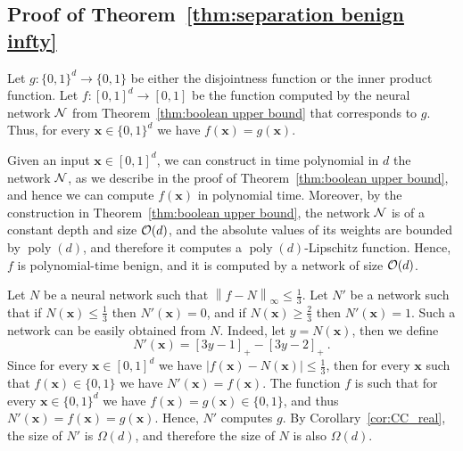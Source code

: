 \documentclass[11pt]{article}
\newcommand{\bx}{\mathbf{x}}
\newcommand{\co}{{\cal O}}
\newcommand{\cn}{{\cal N}}
\DeclareMathOperator{\poly}{poly}
\newcommand{\norm}[1]{\left\|#1\right\|}
\begin{document}
\subsection{Proof of Theorem~\ref{thm:separation benign infty}}
\label{app:proof of theorem separation benign infty}

Let $g:\{0,1\}^d \rightarrow \{0,1\}$ be either the disjointness function or the inner product function.
Let $f:[0,1]^d \rightarrow [0,1]$ be the function computed by the neural network $\cn$ from Theorem~\ref{thm:boolean upper bound} that corresponds to $g$. Thus, for every $\bx \in \{0,1\}^d$ we have $f(\bx)=g(\bx)$.

Given an input $\bx \in [0,1]^d$, we can construct in time polynomial in $d$ the network $\cn$, as we describe in the proof of Theorem~\ref{thm:boolean upper bound}, and hence we can compute $f(\bx)$ in polynomial time. Moreover, by the construction in Theorem~\ref{thm:boolean upper bound}, the network $\cn$ is of a constant depth and size $\co(d)$, and the absolute values of its weights are bounded by $\poly(d)$, and therefore it computes a $\poly(d)$-Lipschitz function. Hence, $f$ is polynomial-time benign, and it is computed by a network of size $\co(d)$. 

Let $N$ be a neural network such that $\norm{f-N}_\infty \leq \frac{1}{3}$. Let $N'$ be a network such that if $N(\bx) \leq \frac{1}{3}$ then $N'(\bx)=0$, and if $N(\bx) \geq \frac{2}{3}$ then $N'(\bx)=1$. Such a network can be easily obtained from $N$. Indeed, let $y=N(\bx)$, then we define 
\[
    N'(\bx) = \left[3y-1\right]_+ - \left[3y-2\right]_+~.
\]
Since for every $\bx \in [0,1]^d$ we have $|f(\bx)-N(\bx)| \leq \frac{1}{3}$, then for every $\bx$ such that $f(\bx) \in \{0,1\}$ we have $N'(\bx)=f(\bx)$. The function $f$ is such that for every $\bx \in \{0,1\}^d$ we have $f(\bx) = g(\bx) \in \{0,1\}$, and thus $N'(\bx)=f(\bx)=g(\bx)$. Hence, $N'$ computes $g$. By Corollary~\ref{cor:CC_real}, the size of $N'$ is $\Omega(d)$, and therefore the size of $N$ is also $\Omega(d)$.
\end{document}
